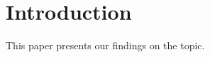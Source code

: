\documentclass{article}
\begin{document}
\section{Introduction}

This paper presents our findings on the topic.
\end{document}
